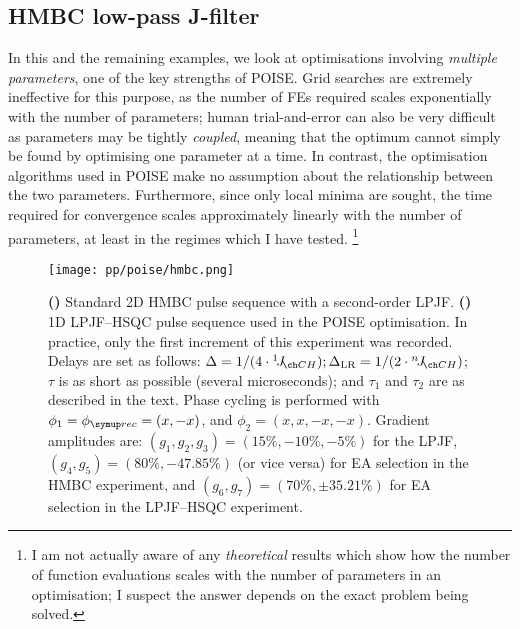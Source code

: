 \subsection{HMBC low-pass J-filter}
\label{subsec:poise__hmbc}

In this and the remaining examples, we look at optimisations involving \textit{multiple parameters}, one of the key strengths of POISE.
Grid searches are extremely ineffective for this purpose, as the number of FEs required scales exponentially with the number of parameters; human trial-and-error can also be very difficult as parameters may be tightly \textit{coupled}, meaning that the optimum cannot simply be found by optimising one parameter at a time.
In contrast, the optimisation algorithms used in POISE make no assumption about the relationship between the two parameters.
Furthermore, since only local minima are sought, the time required for convergence scales approximately linearly with the number of parameters, at least in the regimes which I have tested.%
\footnote{I am not actually aware of any \textit{theoretical} results which show how the number of function evaluations scales with the number of parameters in an optimisation; I suspect the answer depends on the exact problem being solved.}

\begin{figure}[htb]
    \centering
    \texttt{[image: pp/poise/hmbc.png]}%
    {\label{fig:poise_hmbc_pulseq_hmbc}}%
    {\label{fig:poise_hmbc_pulseq_hsqc}}%
    \caption[Pulse sequences used for HMBC optimisation]{
        \textbf{()} Standard 2D HMBC pulse sequence with a second-order LPJF.
        \textbf{()} 1D LPJF--HSQC pulse sequence used in the POISE optimisation.
        In practice, only the first increment of this experiment was recorded.
        Delays are set as follows: $\Delta = 1 / (4 \cdot \oneJ{CH}); \Delta_\text{LR} = 1 / (2 \cdot \nJ{CH})$; $\tau$ is as short as possible (several microseconds); and $\tau_1$ and $\tau_2$ are as described in the text.
        Phase cycling is performed with $\phi_1 = \phirec = (x, -x)$, and $\phi_2 = (x, x, -x, -x)$.
        Gradient amplitudes are: $(g_1, g_2, g_3) = (15\%, -10\%, -5\%)$ for the LPJF, $(g_4, g_5) = (80\%, -47.85\%)$ (or vice versa) for EA selection in the HMBC experiment\autocite{Cicero2001JMR}, and $(g_6, g_7) = (70\%, \pm 35.21\%)$ for EA selection in the LPJF--HSQC experiment.
    }
    \label{fig:poise_hmbc_pulseq}
\end{figure}

